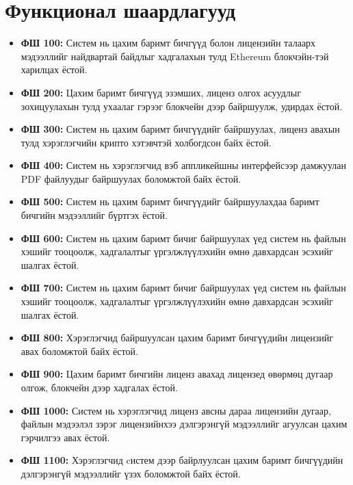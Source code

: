 \section{Функционал шаардлагууд}
\begin{itemize}
      \item \textbf{ФШ 100:} Систем нь цахим баримт бичгүүд болон лицензийн талаарх мэдээллийг найдвартай байдлыг хадгалахын тулд Ethereum блокчэйн-тэй харилцах ёстой.
      \item \textbf{ФШ 200:} Цахим баримт бичгүүд эзэмших, лиценз олгох асуудлыг зохицуулахын тулд ухаалаг гэрээг блокчейн дээр байршуулж, удирдах ёстой.
      \item \textbf{ФШ 300:} Систем нь цахим баримт бичгүүдийг байршуулах, лиценз авахын тулд  хэрэглэгчийн крипто хэтэвчтэй холбогдсон байх ёстой.
      \item \textbf{ФШ 400:} Систем нь хэрэглэгчид вэб аппликейшны интерфейсээр дамжуулан PDF файлуудыг байршуулах боломжтой байх ёстой.
      \item \textbf{ФШ 500:} Систем нь цахим баримт бичгүүдийг байршуулахдаа баримт бичгийн мэдээллийг бүртгэх ёстой.
      \item \textbf{ФШ 600:} Систем нь цахим баримт бичиг байршуулах үед систем нь файлын хэшийг тооцоолж, хадгалалтыг үргэлжлүүлэхийн өмнө давхардсан эсэхийг шалгах ёстой.
      \item \textbf{ФШ 700:} Систем нь цахим баримт бичиг байршуулах үед систем нь файлын хэшийг тооцоолж, хадгалалтыг үргэлжлүүлэхийн өмнө давхардсан эсэхийг шалгах ёстой.
      \item \textbf{ФШ 800:} Хэрэглэгчид байршуулсан цахим баримт бичгүүдийн лицензийг авах боломжтой байх ёстой.
      \item \textbf{ФШ 900:} Цахим баримт бичгийн лиценз авахад лицензед өвөрмөц дугаар олгож, блокчейн дээр хадгалах ёстой.
      \item \textbf{ФШ 1000:} Систем нь хэрэглэгчид лиценз авсны дараа лицензийн дугаар, файлын мэдээлэл зэрэг лицензийнхээ дэлгэрэнгүй мэдээллийг агуулсан цахим гэрчилгээ авах ёстой.
      \item \textbf{ФШ 1100:} Хэрэглэгчид cистем дээр байрлуулсан цахим баримт бичгүүдийн дэлгэрэнгүй мэдээллийг үзэх боломжтой байх ёстой.
\end{itemize}


